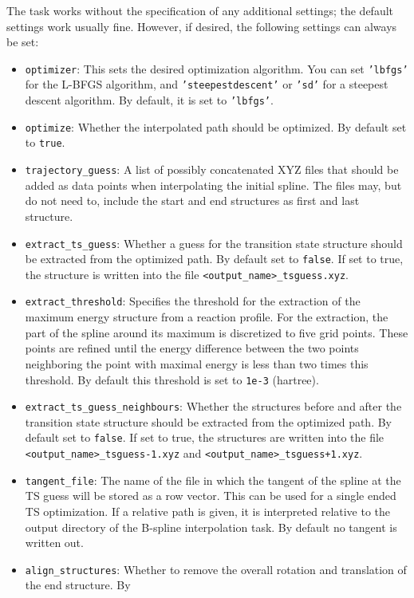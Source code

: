 \documentclass[]{tufte-book}
\begin{document}
The task works without the specification of any additional settings; the default settings work usually fine. However,
if desired, the following settings can always be set:
\begin{itemize}
\item \texttt{optimizer}: This sets the desired optimization algorithm. You can set \texttt{'lbfgs'} for the L-BFGS algorithm, and
\texttt{'steepestdescent'} or \texttt{'sd'} for a steepest descent algorithm. By default, it is set to \texttt{'lbfgs'}.
\item \texttt{optimize}: Whether the interpolated path should be optimized. By default set to \texttt{true}.
\item \texttt{trajectory\_guess}: A list of possibly concatenated XYZ files that should be added as data points when interpolating
the initial spline. The files may, but do not need to, include the start and end structures as first and last structure.
\item \texttt{extract\_ts\_guess}:  Whether a guess for the transition state structure should be extracted from the optimized
path. By default set to \texttt{false}. If set to true, the structure is written into the file \texttt{<output\_name>\_tsguess.xyz}.
\item \texttt{extract\_threshold}: Specifies the threshold for the extraction of the maximum energy structure from a
reaction profile. For the extraction, the part of the spline around its maximum is discretized to five grid points. These
points are refined until the energy difference between the two points neighboring the point with maximal energy is less
than two times this threshold. By default this threshold is set to \texttt{1e-3} (hartree).
\item \texttt{extract\_ts\_guess\_neighbours}: Whether the structures before and after the transition state structure should be
extracted from the optimized path. By default set to \texttt{false}. If set to true, the structures are written into the file
\texttt{<output\_name>\_tsguess-1.xyz} and  \texttt{<output\_name>\_tsguess+1.xyz}.
\item \texttt{tangent\_file}: The name of the file in which the tangent of the spline at the TS guess will be stored as a row vector.
This can be used for a single ended TS optimization. If a relative path is given, it is interpreted relative to the output directory
of the B-spline interpolation task. By default no tangent is written out.
\item \texttt{align\_structures}: Whether to remove the overall rotation and translation of the end structure. By

\end{itemize}
\end{document}
